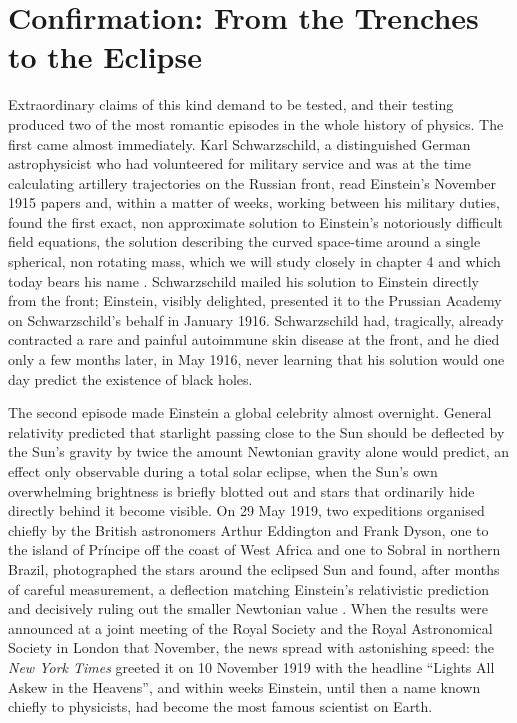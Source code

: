 \section{Confirmation: From the Trenches to the Eclipse}

    Extraordinary claims of this kind demand to be tested, and their testing produced two of the most romantic episodes in the whole history of physics. The first came almost immediately. Karl Schwarzschild, a distinguished German astrophysicist who had volunteered for military service and was at the time calculating artillery trajectories on the Russian front, read Einstein's November 1915 papers and, within a matter of weeks, working between his military duties, found the first exact, non approximate solution to Einstein's notoriously difficult field equations, the solution describing the curved space-time around a single spherical, non rotating mass, which we will study closely in chapter 4 and which today bears his name \citep{schwarzschild1916}. Schwarzschild mailed his solution to Einstein directly from the front; Einstein, visibly delighted, presented it to the Prussian Academy on Schwarzschild's behalf in January 1916. Schwarzschild had, tragically, already contracted a rare and painful autoimmune skin disease at the front, and he died only a few months later, in May 1916, never learning that his solution would one day predict the existence of black holes.

    The second episode made Einstein a global celebrity almost overnight. General relativity predicted that starlight passing close to the Sun should be deflected by the Sun's gravity by twice the amount Newtonian gravity alone would predict, an effect only observable during a total solar eclipse, when the Sun's own overwhelming brightness is briefly blotted out and stars that ordinarily hide directly behind it become visible. On 29 May 1919, two expeditions organised chiefly by the British astronomers Arthur Eddington and Frank Dyson, one to the island of Pr\'{i}ncipe off the coast of West Africa and one to Sobral in northern Brazil, photographed the stars around the eclipsed Sun and found, after months of careful measurement, a deflection matching Einstein's relativistic prediction and decisively ruling out the smaller Newtonian value \citep{dyson1920}. When the results were announced at a joint meeting of the Royal Society and the Royal Astronomical Society in London that November, the news spread with astonishing speed: the \textit{New York Times} greeted it on 10 November 1919 with the headline ``Lights All Askew in the Heavens'', and within weeks Einstein, until then a name known chiefly to physicists, had become the most famous scientist on Earth.

